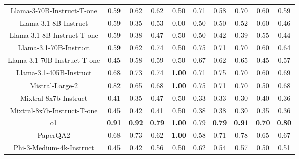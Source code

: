 \begin{tabular}{cccccccccc}
Llama-3-70B-Instruct-T-one & 0.59 & 0.62 & 0.62 & 0.50 & 0.71 & 0.58 & 0.70 & 0.60 & 0.59 \\
Llama-3.1-8B-Instruct & 0.59 & 0.35 & 0.53 & 0.00 & 0.50 & 0.50 & 0.52 & 0.60 & 0.46 \\
Llama-3.1-8B-Instruct-T-one & 0.59 & 0.38 & 0.47 & 0.50 & 0.50 & 0.42 & 0.39 & 0.55 & 0.44 \\
Llama-3.1-70B-Instruct & 0.59 & 0.62 & 0.74 & 0.50 & 0.75 & 0.71 & 0.70 & 0.60 & 0.64 \\
Llama-3.1-70B-Instruct-T-one & 0.45 & 0.58 & 0.59 & 0.50 & 0.67 & 0.62 & 0.65 & 0.45 & 0.57 \\
Llama-3.1-405B-Instruct & 0.68 & 0.73 & 0.74 & \textbf{1.00} & 0.71 & 0.75 & 0.70 & 0.60 & 0.69 \\
Mistral-Large-2 & 0.82 & 0.65 & 0.68 & \textbf{1.00} & 0.75 & 0.71 & 0.70 & 0.50 & 0.68 \\
Mixtral-8x7b-Instruct & 0.41 & 0.35 & 0.47 & 0.50 & 0.33 & 0.33 & 0.30 & 0.40 & 0.36 \\
Mixtral-8x7b-Instruct-T-one & 0.45 & 0.42 & 0.41 & 0.50 & 0.38 & 0.38 & 0.30 & 0.35 & 0.36 \\
o1 & \textbf{0.91} & \textbf{0.92} & \textbf{0.79} & \textbf{1.00} & 0.79 & \textbf{0.79} & \textbf{0.91} & \textbf{0.70} & \textbf{0.80} \\
PaperQA2 & 0.68 & 0.73 & 0.62 & \textbf{1.00} & 0.58 & 0.71 & 0.78 & 0.65 & 0.67 \\
Phi-3-Medium-4k-Instruct & 0.45 & 0.42 & 0.56 & 0.50 & 0.62 & 0.54 & 0.57 & 0.50 & 0.51 \\
\bottomrule
\end{tabular}
